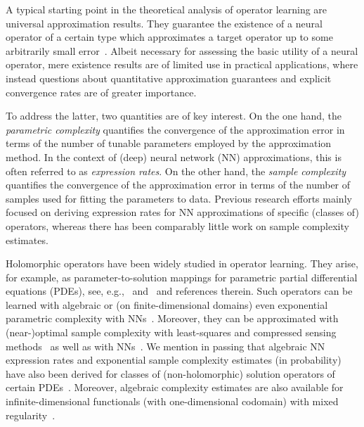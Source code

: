 \documentclass[namedate,webpdf]{ima-authoring-template-blank}
\numberwithin{counter}{section}
\numberwithin{equation}{section}
\theoremstyle{plain}
\theoremstyle{definition}
\theoremstyle{thmstyletwo}
\begin{document}
A typical starting point in the theoretical analysis of operator learning are universal approximation results. They guarantee the existence of a neural operator of a certain type which approximates a target operator up to some arbitrarily small error~\citep{chen_UniversalApproximationNonlinearOperators_1995, lanthaler_ErrorEstimatesDeepONetsDeep_2022, kovachki_UniversalApproximationErrorBounds_2021, lanthaler_NonlocalityNonlinearityImpliesUniversality_2025, lanthaler_OperatorLearningPCANetUpper_2023}. Albeit necessary for assessing the basic utility of a neural operator, mere existence results are of limited use in practical applications, where instead questions about quantitative approximation guarantees and explicit convergence rates are of greater importance. 

To address the latter, two quantities are of key interest. On the one hand, the \emph{parametric complexity} quantifies the convergence of the approximation error in terms of the number of tunable parameters employed by the approximation method. In the context of (deep) neural network (NN) approximations, this is often referred to as \emph{expression rates}. On the other hand, the \emph{sample complexity} quantifies the convergence of the approximation error in terms of the number of samples used for fitting the parameters to data. Previous research efforts mainly focused on deriving expression rates for NN approximations of specific (classes of) operators, whereas there has been comparably little work on sample complexity estimates.

Holomorphic operators have been widely studied in operator learning. They arise, for example, as parameter-to-solution mappings for parametric partial differential equations (PDEs), see, e.g.,~\citet{cohen_ApproximationHighdimensionalParametricPDEs_2015} and~\mbox{\citet[Ch. 4]{adcock_SparsePolynomialApproximationHighDimensional_2022}} and references therein. Such operators can be learned with algebraic or (on finite-dimensional domains) even exponential parametric complexity with NNs~\citep{opschoor_ExponentialReLUDNNExpression_2022, herrmann_NeuralSpectralOperatorSurrogates_2024, schwab_DeepLearningHighDimension_2023}. Moreover, they can be approximated with (near-)optimal sample complexity with least-squares and compressed sensing methods~\citep{adcock_EfficientAlgorithmsComputingNearBest_2024, bartel_SamplingRecoveryBochnerSpaces_2024, adcock_OptimalApproximationInfinitedimensionalHolomorphic_2024, adcock_OptimalApproximationInfinitedimensionalHolomorphic_2025} as well as with NNs~\citep{adcock_OptimalDeepLearningHolomorphic_2024, 
adcock_LearningSmoothFunctionsHigh_2024,
adcock_NearoptimalLearningBanachvaluedHighdimensional_2025}.
We mention in passing that algebraic NN expression rates and exponential sample complexity estimates (in probability) have also been derived for classes of (non-holomorphic) solution operators of certain PDEs~\citep{ryck_GenericBoundsApproximationError_2022, boulle_EllipticPDELearningProvably_2023}. Moreover, algebraic complexity estimates are also available for infinite-dimensional functionals (with one-dimensional codomain) with mixed regularity~\citep{dung_HyperbolicCrossApproximationInfinite_2016}.
\end{document}
